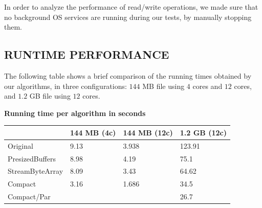\documentclass[a4paper,twoside]{article}
\begin{document}
In order to analyze the performance of read/write operations, we made sure that no background OS services are running during our tests, by manually stopping them.




\subsection{\uppercase{Runtime performance}}\label{subsec:uppercase9}

The following table shows a brief comparison of the running times obtained by our algorithms, in three configurations: $144$ MB file using $4$ cores and $12$ cores, and $1.2$ GB file using $12$ cores. 

\begin{small}
\par
\begin{center}
\textbf{Running time per algorithm in seconds} \\
\begin{tabular}{|C{2cm}|C{1.2cm}|C{1.2cm}|C{1.2cm}|}
\hline
						& 144 MB (4c)	& 144 MB (12c)		& 1.2 GB (12c)	\\ \hline
Original				& 9.13 			& 3.938 			& 123.91 		\\ \hline
PresizedBuffers			& 8.98 			& 4.19 				& 75.1 			\\ \hline
StreamByteArray			& 8.09 			& 3.43 				& 64.62 		\\ \hline
Compact 				& 3.16 			& 1.686 			& 34.5			\\ \hline
Compact/Par 			& 			    & 					& 26.7 			\\ \hline
\end{tabular}
\end{center}
\end{small}
\end{document}
